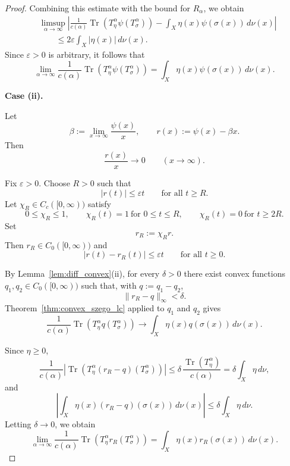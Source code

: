 \documentclass[10pt,a4paper]{amsart}
\begin{document}
\begin{proof}
Combining this estimate with the bound for $R_\alpha$, we obtain
\[
\begin{aligned}
&\limsup_{\alpha\to\infty}
\left|
\frac{1}{c(\alpha)}
\operatorname{Tr}\!\left(
T_\eta^\alpha\psi(T_\sigma^\alpha)
\right)
-
\int_X\eta(x)\psi(\sigma(x))\,d\nu(x)
\right|
\\
&\qquad\leq
2\varepsilon\int_X|\eta(x)|\,d\nu(x).
\end{aligned}
\]
Since $\varepsilon>0$ is arbitrary, it follows that
\[
\lim_{\alpha\to\infty}
\frac{1}{c(\alpha)}
\operatorname{Tr}\!\left(
T_\eta^\alpha\psi(T_\sigma^\alpha)
\right)
=
\int_X\eta(x)\psi(\sigma(x))\,d\nu(x).
\]


\medskip
\noindent
\textbf{Case (ii).}

Let
\[
\beta:=\lim_{x\to\infty}\frac{\psi(x)}{x},
\qquad
r(x):=\psi(x)-\beta x.
\]
Then
\[
\frac{r(x)}{x}\longrightarrow0
\qquad (x\to\infty).
\]

Fix $\varepsilon>0$. Choose $R>0$ such that
\[
|r(t)|\leq\varepsilon t
\qquad\text{for all }t\geq R.
\]
Let $\chi_R\in C_c([0,\infty))$ satisfy
\[
0\leq\chi_R\leq1,\qquad
\chi_R(t)=1\ \text{for }0\leq t\leq R,\qquad
\chi_R(t)=0\ \text{for }t\geq2R.
\]
Set
\[
r_R:=\chi_R r.
\]
Then $r_R\in C_0([0,\infty))$ and
\[
|r(t)-r_R(t)|\leq\varepsilon t
\qquad\text{for all }t\geq0.
\]

By Lemma~\ref{lem:diff_convex}(ii), for every $\delta>0$ there exist convex functions
$q_1,q_2\in C_0([0,\infty))$ such that, with
$q:=q_1-q_2$,
\[
\|r_R-q\|_\infty<\delta.
\]
Theorem~\ref{thm:convex_szego_lc} applied to $q_1$ and $q_2$ gives
\[
\frac{1}{c(\alpha)}
\operatorname{Tr}\!\left(
T_\eta^\alpha q(T_\sigma^\alpha)
\right)
\longrightarrow
\int_X\eta(x)q(\sigma(x))\,d\nu(x).
\]

Since $\eta\geq0$,
\[
\frac{1}{c(\alpha)}
\left|
\operatorname{Tr}\!\left(
T_\eta^\alpha(r_R-q)(T_\sigma^\alpha)
\right)
\right|
\leq
\delta\,
\frac{\operatorname{Tr}(T_\eta^\alpha)}{c(\alpha)}
=
\delta\int_X\eta\,d\nu,
\]
and
\[
\left|
\int_X\eta(x)(r_R-q)(\sigma(x))\,d\nu(x)
\right|
\leq
\delta\int_X\eta\,d\nu.
\]
Letting $\delta\to0$, we obtain
\[
\lim_{\alpha\to\infty}
\frac{1}{c(\alpha)}
\operatorname{Tr}\!\left(
T_\eta^\alpha r_R(T_\sigma^\alpha)
\right)
=
\int_X\eta(x)r_R(\sigma(x))\,d\nu(x).
\]


\end{proof}
\end{document}
